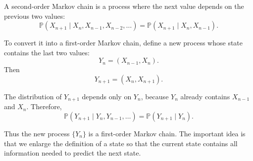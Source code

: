 \documentclass[12pt,a4paper]{article}
\theoremstyle{lecturestyle}
\newcommand{\Prob}{\mathbb{P}}
\begin{document}
A second-order Markov chain is a process where the next value depends on the previous two values:
\[
\Prob(X_{n+1}\mid X_n,X_{n-1},X_{n-2},\ldots)
=
\Prob(X_{n+1}\mid X_n,X_{n-1}).
\]

To convert it into a first-order Markov chain, define a new process whose state contains the last two values:
\[
Y_n=(X_{n-1},X_n).
\]
Then
\[
Y_{n+1}=(X_n,X_{n+1}).
\]

The distribution of $Y_{n+1}$ depends only on $Y_n$, because $Y_n$ already contains $X_{n-1}$ and $X_n$. Therefore,
\[
\Prob(Y_{n+1}\mid Y_n,Y_{n-1},\ldots)
=
\Prob(Y_{n+1}\mid Y_n).
\]

Thus the new process $\{Y_n\}$ is a first-order Markov chain. The important idea is that we enlarge the definition of a state so that the current state contains all information needed to predict the next state.
\end{document}
